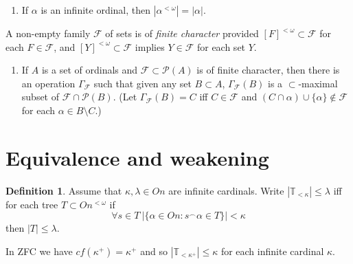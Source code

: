 \documentclass[a4paper,10pt,reqno]{amsart}
\numberwithin{equation}{section}
\theoremstyle{definition}
\newtheorem{definition}[theorem]{Definition}
\theoremstyle{remark}
\newcommand{\mc}[1]{\mathcal{#1}}
\newcommand{\mbb}[1]{\mathbb{#1}}
\newcommand{\setm}{\setminus}
\newcommand{\subs}{\subset}
\begin{document}
   

\begin{enumerate}[(F1)]
\item \label{f1} If ${\alpha}$ is an infinite ordinal, then 
$|{\alpha}^{<{\omega}}|=|{\alpha}|$.
\end{enumerate}

A non-empty family ${\mathcal {F}}$ of sets  is of {\em finite character} provided 
$ {[F]}^{<{\omega}}\subs \mc F $ for each $F\in \mc F$, 
and ${[Y]}^{<{\omega}}\subs \mc F$ implies $Y\in \mc F$ for each set $Y$.


\begin{enumerate}[(F1)]\addtocounter{enumi}{1}
\item \label{f3} If $A$ is a set of ordinals 
and $\mc F\subs \mc P(A)$ is of finite character, then 
there is an operation $\Gamma_{\mc F}$ such that 
given any set $B\subs  A$,  $\Gamma_{\mc F}(B)$ is a $\subs$-maximal subset of 
$\mc F\cap \mc P(B)$. (Let $\Gamma_{\mc F}(B)=C$ iff $C\in \mc F$ and 
$(C\cap {\alpha})\cup\{{\alpha}\}\notin \mc F$
for each ${\alpha}\in B\setm C$.) 

\end{enumerate}


\section{Equivalence and weakening}\label{sec:elementary}
\begin{definition}
    Assume that  ${\kappa},{\lambda}\in On$  are infinite cardinals.  Write  
    $|\mbb T_{<{\kappa}}|\le {\lambda}$
    iff for each tree   $T\subs On^{<{\omega}}$ if  
    \begin{displaymath}
    \forall s\in T\ |\{{\alpha}\in On: s^\frown {\alpha}\in T\}|<{\kappa}
    \end{displaymath}
    then   $|T|\le {\lambda}.$
    \end{definition}
    
    
    In ZFC we have  
    $cf({\kappa}^+)={\kappa}^+$ and so 
    $|\mbb T_{<{\kappa}^+}|\le {\kappa}$ for each infinite cardinal ${\kappa}$.
\end{document}

